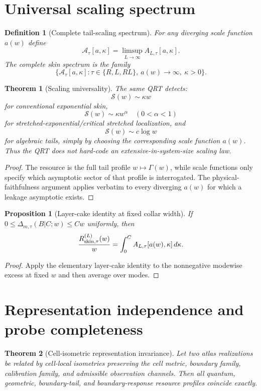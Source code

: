 \documentclass[11pt]{article}
\newtheorem{definition}{Definition}
\newtheorem{theorem}{Theorem}
\newtheorem{proposition}{Proposition}
\begin{document}
\section{Universal scaling spectrum}

\begin{definition}[Complete tail-scaling spectrum]
For any diverging scale function $a(w)$ define
\[
\mathcal A_\tau[a,\kappa]
=
\limsup_{L\to\infty}
A_{L,\tau}[a,\kappa].
\]
The complete skin spectrum is the family
\[
\{\mathcal A_\tau[a,\kappa]
:\tau\in\{R,L,RL\},\ a(w)\to\infty,\ \kappa>0\}.
\]
\end{definition}

\begin{theorem}[Scaling universality]
The same QRT detects:
\[
\mathcal S(w)\sim\kappa w
\]
for conventional exponential skin,
\[
\mathcal S(w)\sim\kappa w^\alpha
\quad(0<\alpha<1)
\]
for stretched-exponential/critical stretched localization, and
\[
\mathcal S(w)\sim c\log w
\]
for algebraic tails, simply by choosing the corresponding scale function $a(w)$. Thus the
QRT does not hard-code an extensive-in-system-size scaling law.
\end{theorem}

\begin{proof}
The resource is the full tail profile $w\mapsto\Gamma(w)$, while scale functions only
specify which asymptotic sector of that profile is interrogated. The physical-faithfulness
argument applies verbatim to every diverging $a(w)$ for which a leakage asymptotic exists.
\end{proof}

\begin{proposition}[Layer-cake identity at fixed collar width]
If $0\le\Delta_{m,\tau}(B|C;w)\le Cw$ uniformly, then
\[
\frac{R_{\rm skin,\tau}^{(L)}(w)}{w}
=\int_0^C A_{L,\tau}[a(w),\kappa]\,d\kappa.
\]
\end{proposition}

\begin{proof}
Apply the elementary layer-cake identity to the nonnegative modewise excess at fixed $w$ and
then average over modes.
\end{proof}

\section{Representation independence and probe completeness}

\begin{theorem}[Cell-isometric representation invariance]
Let two atlas realizations be related by cell-local isometries preserving the cell metric, boundary
family, calibration family, and admissible observation channels. Then all quantum, geometric,
boundary-tail, and boundary-response resource profiles coincide exactly.
\end{theorem}
\end{document}
